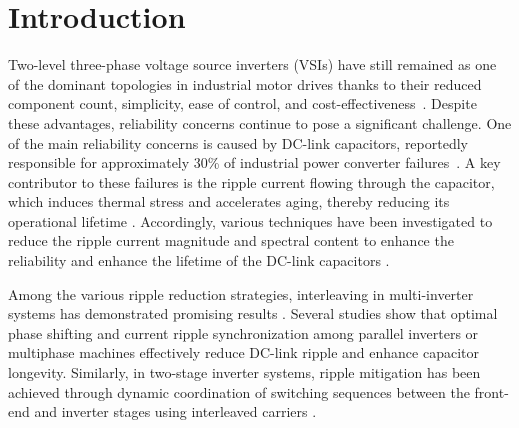 \documentclass{IPEC2026}
\begin{document}
\section{Introduction}
\label{sec:introduction}
Two-level three-phase voltage source inverters (VSIs)  have still remained as one of the dominant topologies in industrial motor drives thanks to their reduced component count, simplicity, ease of control, and cost-effectiveness~\cite{IndustrialMotorDrives,IndustrialDrives}.
Despite these advantages, reliability concerns continue to pose a significant challenge.
One of the main reliability concerns is caused by DC-link capacitors, reportedly responsible for approximately 30\% of industrial power converter failures~\cite{CapacitorFailure}. 
A key contributor to these failures is the ripple current flowing through the capacitor, which induces thermal stress and accelerates aging, thereby reducing its operational lifetime \cite{LifetimeExtension-SingleInverter-PWM, LifeTimeExtension-ThreeLevel-CarrierBased}.
Accordingly, various techniques have been investigated to reduce the ripple current magnitude and spectral content to enhance the reliability and enhance the lifetime of the DC-link capacitors \cite{PWM_methods1, SectorBased-PWM, DualMotor-modulation1,multiinverter-modulation1, dualmotor-interleaving, Interleaving-DualMotor, DualMotor-Interleaved-Parallel, PWM-CarrierBased, TwoStage-RippleReduction,  PhaseShift-PreConverter, DiscontinousPWM-ThreeLevel, VariableSwitchingSequence-ThreeLevel, Three-level-Phase-Disposition, AdaptiveSwitching-solarInverter, RippleReduction-4-Wires}.

Among the various ripple reduction strategies, interleaving in multi-inverter systems has demonstrated promising results \cite{DualMotor-Interleaved-Parallel,multiinverter-modulation1,dualmotor-interleaving, DualMotor-modulation1,Interleaving-DualMotor}.
Several studies show that optimal phase shifting and current ripple synchronization among parallel inverters or multiphase machines effectively reduce DC-link ripple and enhance capacitor longevity.
Similarly, in two-stage inverter systems, ripple mitigation has been achieved through dynamic coordination of switching sequences between the front-end and inverter stages
using interleaved carriers \cite{PhaseShift-PreConverter, TwoStage-RippleReduction}.
\end{document}
